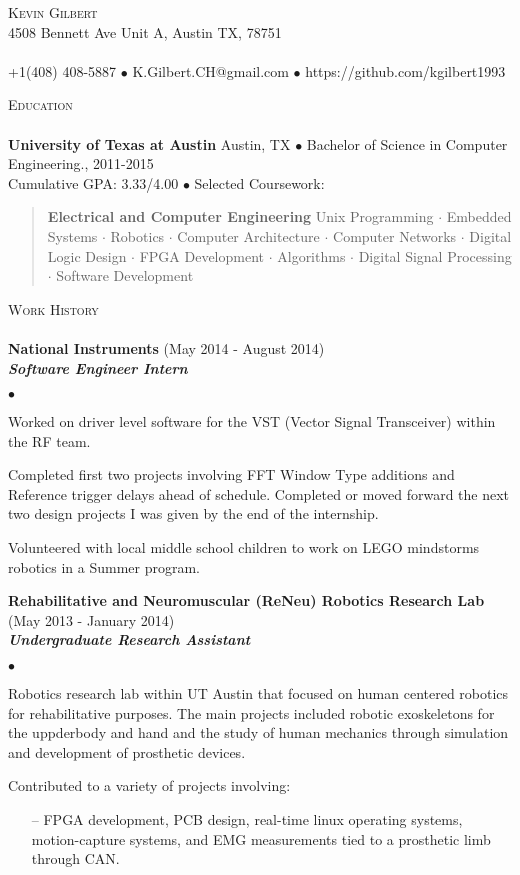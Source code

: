 \documentclass[11pt]{article}
\newcommand{\area}[2]{\vspace*{-9pt} \begin{verse}\textbf{#1}   #2 \end{verse}  }
\newcommand{\lineunder}{\vspace*{-8pt} \\ \hspace*{-18pt} \hrulefill \\}
\newcommand{\header}[1]{{\hspace*{-10pt}\vspace*{6pt} \textsc{#1}} \vspace*{-6pt} \lineunder}
\newcommand{\employer}[3]{{ \textbf{#1} (#2)\\ \textbf{\emph{#3}}}\\  }
\newcommand{\contact}[3]{
\vspace*{-8pt}
\begin{center}
{\LARGE \scshape {#1}}\\
#2 \lineunder 
#3
\end{center}
\vspace*{-8pt}
}
\newenvironment{achievements}{\begin{list}{$\bullet$}{\topsep 0pt \itemsep -2pt}}{\vspace*{4pt}\end{list}}
\newcommand{\schoolwithcourses}[4]{
 \textbf{#1} #2 $\bullet$ #3\\ 
#4 $\bullet$  Selected Coursework:\\
\vspace*{5pt}
}
\begin{document}
\small
\smallskip
\vspace*{-30pt}

\contact{Kevin Gilbert}
{4508 Bennett Ave Unit A, Austin TX, 78751}
{+1(408) 408-5887 $\bullet$ K.Gilbert.CH@gmail.com  $\bullet$ https://github.com/kgilbert1993}

\header{Education}

\schoolwithcourses{University of Texas at Austin}{Austin, TX}{Bachelor of Science in Computer Engineering., 2011-2015}
{Cumulative GPA: 3.33/4.00}
	\area{Electrical and Computer Engineering}{ Unix Programming $\cdot$ Embedded Systems $\cdot$ Robotics $\cdot$ Computer Architecture $\cdot$ Computer Networks $\cdot$ Digital Logic Design $\cdot$ FPGA Development $\cdot$
 Algorithms $\cdot$ Digital Signal Processing $\cdot$ Software Development}

\header{Work History}
\employer{National Instruments}{May 2014 - August 2014}{Software Engineer Intern}
	\begin{achievements}
	\item Worked on driver level software for the VST (Vector Signal Transceiver) within the RF team.
    \item Completed first two projects involving FFT Window Type additions and Reference trigger delays ahead of schedule. Completed or moved forward the next two design projects I was given by the end of the internship.
    \item Volunteered with local middle school children to work on LEGO mindstorms robotics in a Summer program.
	\end{achievements}

\employer{Rehabilitative and Neuromuscular (ReNeu) Robotics Research Lab}{May 2013 - January 2014}{Undergraduate Research Assistant}
	\begin{achievements}
    \item Robotics research lab within UT Austin that focused on human centered robotics for rehabilitative purposes. The main projects included robotic exoskeletons for the uppderbody and hand and the study of human mechanics through simulation and development of prosthetic devices. 
	\item Contributed to a variety of projects involving:
    	\begin{enumerate}
        	\item[--] FPGA development, PCB design, real-time linux operating systems, motion-capture systems, and EMG measurements tied to a prosthetic limb through CAN.
        \end{enumerate}
	\end{achievements}
\end{document}
